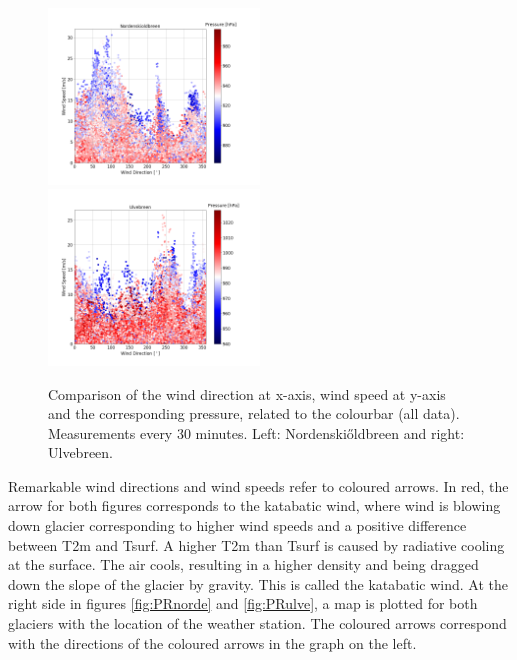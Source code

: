 \documentclass[11pt]{report}
\begin{document}
\begin{figure}[h]
\includegraphics[scale=1, width=0.5\textwidth]{WD-WS-PR-Nordenskioldbreen.png}
\includegraphics[scale=1, width=0.5\textwidth]{WD-WS-PR-Ulvebreen.png}
\caption{Comparison of the wind direction at x-axis, wind speed at y-axis and the corresponding pressure, related to the colourbar (all data). Measurements every 30 minutes. Left: Nordenski\H{o}ldbreen and right: Ulvebreen.}
\label{fig:PR}
\end{figure}

\newpage
Remarkable wind directions and wind speeds refer to coloured arrows. In red, the arrow for both figures corresponds to the katabatic wind, where wind is blowing down glacier corresponding to higher wind speeds and a positive difference between T2m and Tsurf. A higher T2m than Tsurf is caused by radiative cooling at the surface. The air cools, resulting in a higher density and being dragged down the slope of the glacier by gravity. This is called the katabatic wind. At the right side in figures \ref{fig:PRnorde} and \ref{fig:PRulve}, a map is plotted for both glaciers with the location of the weather station. The coloured arrows correspond with the directions of the coloured arrows in the graph on the left. 
\end{document}
